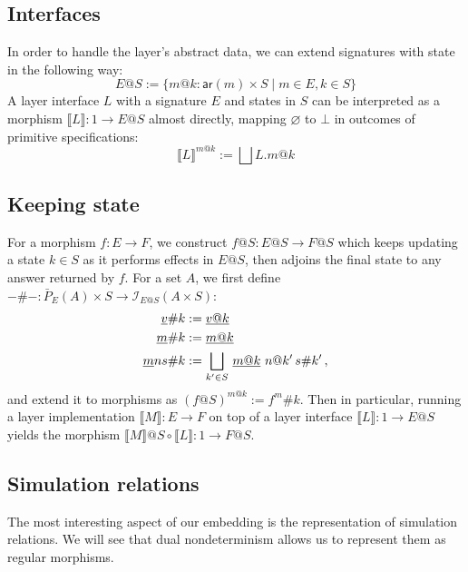 \documentclass[11pt,oneside,draft]{book}
\theoremstyle{definition}
\newcommand{\kw}[1]{\ensuremath{ \mathsf{#1} }}
\newcommand{\ul}[1]{%
  \underline{\smash{#1}}
}
\begin{document}

\subsection{Interfaces} %

In order to handle the layer's abstract data,
we can extend signatures with state in the following way:
\[
  E@S :=
    \{ m@k : \kw{ar}(m) \times S \mid
       m \in E, k \in S \}
\]
A layer interface $L$ with a signature $E$
and states in $S$
can be interpreted as
a morphism $\llbracket L \rrbracket : 1 \rightarrow E@S$
almost directly,
mapping $\varnothing$ to $\bot$
in outcomes of primitive specifications:
\[
  \llbracket L \rrbracket^{m@k} :=
    \bigsqcup L.m@k
\]


\subsection{Keeping state} %

For a morphism $f : E \rightarrow F$,
we construct $f@S : E@S \rightarrow F@S$
which keeps updating a state $k \in S$
as it performs effects in $E@S$,
then adjoins the final state to any answer
returned by $f$.
For a set $A$, we first define
$-\#- : \bar{P}_E(A) \times S \rightarrow \mathcal{I}_{E@S}(A \times S)$:
\begin{align*}
  \ul{v}\#k &:= \ul{v@k} \\
  \ul{m}\#k &:= \ul{m@k} \\
  \ul{m}ns\#k &:=
    \bigsqcup_{k' \in S} \, \ul{m@k} \,\, n@k' \, s\#k' \,,
\end{align*}
and extend it to morphisms as $(f@S)^{m@k} := f^m\#k$.
Then in particular,
running a layer implementation
$\llbracket M \rrbracket : E \rightarrow F$
on top of a layer interface
$\llbracket L \rrbracket : 1 \rightarrow E@S$
yields the morphism
$\llbracket M \rrbracket @ S \circ \llbracket L \rrbracket :
 1 \rightarrow F@S$.


\subsection{Simulation relations} %

The most interesting aspect of our embedding
is the representation of simulation relations.
We will see that dual nondeterminism
allows us to represent them as regular morphisms.
\end{document}
